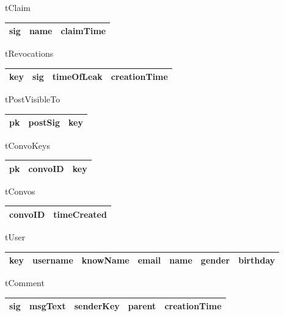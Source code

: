 tClaim
\begin{center}
    \begin{tabular}{ | l | l | l |}
    \hline
    sig & name & claimTime \\ \hline
    \end{tabular}
\end{center}

tRevocations
\begin{center}
    \begin{tabular}{ | l | l | l | l |}
    \hline
    key & sig & timeOfLeak & creationTime \\ \hline
    \end{tabular}
\end{center}

tPostVisibleTo
\begin{center}
    \begin{tabular}{ | l | l | l |}
    \hline
    pk & postSig & key \\ \hline
    \end{tabular}
\end{center}

tConvoKeys
\begin{center}
    \begin{tabular}{ | l | l | l |}
    \hline
    pk & convoID & key \\ \hline
    \end{tabular}
\end{center}

tConvos
\begin{center}
    \begin{tabular}{ | l | l |}
    \hline
    convoID & timeCreated \\ \hline
    \end{tabular}
\end{center}

tUser
\begin{center}
    \begin{tabular}{ | l | l | l | l | l | l | l |}
    \hline
    key & username & knowName & email & name & gender & birthday \\ \hline
    \end{tabular}
\end{center}

tComment
\begin{center}
    \begin{tabular}{ | l | l | l | l | l |}
    \hline
    sig & msgText & senderKey & parent & creationTime \\ \hline
    \end{tabular}
\end{center}

